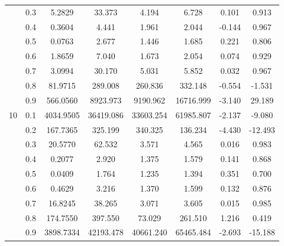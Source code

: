 \documentclass[11pt,a4paper]{report}
\begin{document}
\begin{longtable}{ | c | c || c | c | c | c | c | c | }
 & 0.3 & 5.2829 & 33.373 & 4.194 & 6.728 & 0.101 & 0.913 \\
 & 0.4 & 0.3604 & 4.441 & 1.961 & 2.044 & -0.144 & 0.967 \\
 & 0.5 & 0.0763 & 2.677 & 1.446 & 1.685 & 0.221 & 0.806 \\
 & 0.6 & 1.8659 & 7.040 & 1.673 & 2.054 & 0.074 & 0.929 \\
 & 0.7 & 3.0994 & 30.170 & 5.031 & 5.852 & 0.032 & 0.967 \\
 & 0.8 & 81.9715 & 289.008 & 260.836 & 332.148 & -0.554 & -1.531 \\
 & 0.9 & 566.0560 & 8923.973 & 9190.962 & 16716.999 & -3.140 & 29.189 \\
 \hline
\multirow{9}{*}{10} & 0.1 & 4034.9505 & 36419.086 & 33603.254 & 61985.807 & -2.137 & -9.080 \\
 & 0.2 & 167.7365 & 325.199 & 340.325 & 136.234 & -4.430 & -12.493 \\
 & 0.3 & 20.5770 & 62.532 & 3.571 & 4.565 & 0.016 & 0.983 \\
 & 0.4 & 0.2077 & 2.920 & 1.375 & 1.579 & 0.141 & 0.868 \\
 & 0.5 & 0.0409 & 1.764 & 1.235 & 1.394 & 0.351 & 0.700 \\
 & 0.6 & 0.4629 & 3.216 & 1.370 & 1.599 & 0.132 & 0.876 \\
 & 0.7 & 16.8245 & 38.265 & 3.071 & 3.605 & 0.015 & 0.985 \\
 & 0.8 & 174.7550 & 397.550 & 73.029 & 261.510 & 1.216 & 0.419 \\
 & 0.9 & 3898.7334 & 42193.478 & 40661.240 & 65465.484 & -2.693 & -15.188 \\
 \hline
\hline
\end{longtable}
\end{document}
